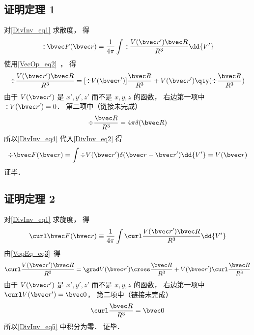 \subsection{证明定理 1}
对\autoref{DivInv_eq1} 求散度， 得
\begin{equation}\label{DivInv_eq2}
\div \bvec F(\bvec r) = \frac{1}{4\pi}\int \div \frac{V(\bvec r') \bvec R}{R^3} \dd{V'}
\end{equation}
使用\autoref{VecOp_eq2}~， 得
\begin{equation}\label{DivInv_eq4}
\div \frac{V(\bvec r') \bvec R}{R^3} = [\div V(\bvec r')] \frac{ \bvec R}{R^3} + V(\bvec r') \qty(\div \frac{\bvec R}{R^3})
\end{equation}
由于 $V(\bvec r')$ 是 $x', y', z'$ 而不是 $x, y, z$ 的函数， 右边第一项中 $\div V(\bvec r') = 0$． 第二项中（链接未完成）
\begin{equation}
\div \frac{\bvec R}{R^3} = 4\pi \delta(\bvec R)
\end{equation}
所以\autoref{DivInv_eq4} 代入\autoref{DivInv_eq2} 得
\begin{equation}
\div \bvec F(\bvec r) = \int \div V(\bvec r') \delta(\bvec r - \bvec r') \dd{V'} = V(\bvec r)
\end{equation}
证毕．

\subsection{证明定理 2}
对\autoref{DivInv_eq1} 求旋度， 得
\begin{equation}\label{DivInv_eq5}
\curl \bvec F(\bvec r) \equiv \frac{1}{4\pi}\int \curl \frac{V(\bvec r') \bvec R}{R^3} \dd{V'}
\end{equation}
由\autoref{VopEq_eq3}~得
\begin{equation}
\curl \frac{V(\bvec r') \bvec R}{R^3} = \grad V(\bvec r') \cross \frac{\bvec R}{R^3} + V(\bvec r') \curl \frac{\bvec R}{R^3}
\end{equation}
由于 $V(\bvec r')$ 是 $x', y', z'$ 而不是 $x, y, z$ 的函数， 右边第一项中 $\curl V(\bvec r') = \bvec 0$， 第二项中（链接未完成）
\begin{equation}
\curl \frac{\bvec R}{R^3} = \bvec 0
\end{equation}
所以\autoref{DivInv_eq5} 中积分为零． 证毕．

